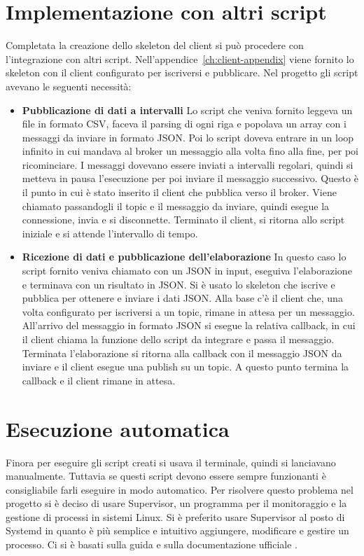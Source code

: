 \section{Implementazione con altri script}
\label{sec:client-implementazione}
Completata la creazione dello skeleton del client si può procedere con l'integrazione con altri script.
Nell'appendice~\ref{ch:client-appendix} viene fornito lo skeleton 
con il client configurato per iscriversi e pubblicare.
Nel progetto gli script avevano le seguenti necessità:
\begin{itemize}
	\item \textbf{Pubblicazione di dati a intervalli}\newline 
	Lo script che veniva fornito leggeva un file in formato CSV, faceva il parsing di ogni riga 
	e popolava un array con i messaggi da inviare in formato JSON.
	Poi lo script doveva entrare in un loop infinito in cui mandava al broker un messaggio alla volta fino alla fine, per poi ricominciare.
	I messaggi dovevano essere inviati a intervalli regolari, 
	quindi si metteva in pausa l'esecuzione per poi inviare il messaggio successivo.
	Questo è il punto in cui è stato inserito il client che pubblica verso il broker.
	Viene chiamato passandogli il topic e il messaggio da inviare, quindi esegue la connessione, invia e si disconnette.
	Terminato il client, si ritorna allo script iniziale e si attende l'intervallo di tempo.

	\item \textbf{Ricezione di dati e pubblicazione dell'elaborazione}\newline
	In questo caso lo script fornito veniva chiamato con un JSON in input, 
	eseguiva l'elaborazione e terminava con un risultato in JSON.
	Si è usato lo skeleton che iscrive e pubblica per ottenere e inviare i dati JSON.
	Alla base c'è il client che, una volta configurato per iscriversi a un topic, rimane in attesa per un messaggio.
	All'arrivo del messaggio in formato JSON si esegue la relativa callback, 
	in cui il client chiama la funzione dello script da integrare e passa il messaggio.
	Terminata l'elaborazione si ritorna alla callback con il messaggio JSON da inviare e il client esegue una publish su un topic.
	A questo punto termina la callback e il client rimane in attesa. 

\end{itemize}


\section{Esecuzione automatica}
\label{sec:client-supervisor}
Finora per eseguire gli script creati si usava il terminale, quindi si lanciavano manualmente.
Tuttavia se questi script devono essere sempre funzionanti è consigliabile farli eseguire in modo automatico.
Per risolvere questo problema nel progetto si è deciso di usare Supervisor, 
un programma per il monitoraggio e la gestione di processi in sistemi Linux.
Si è preferito usare Supervisor al posto di Systemd in quanto 
è più semplice e intuitivo aggiungere, modificare e gestire un processo.
Ci si è basati sulla guida \cite{client-supervisor-guida} e sulla documentazione ufficiale \cite{client-supervisor-doc}.

